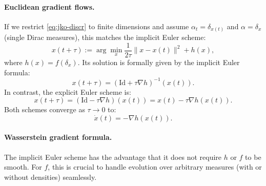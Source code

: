 \paragraph{Euclidean gradient flows.}

If we restrict \eqref{eq:jko-discr} to finite dimensions and assume $\alpha_t = \delta_{x(t)}$ and $\alpha = \delta_x$ (single Dirac measures), this matches the implicit Euler scheme:
\begin{equation}
    x(t+\tau) := \arg\min_x \frac{1}{2 \tau} \|x - x(t)\|^2 + h(x),
\end{equation}
where $h(x) = f(\delta_x)$. Its solution is formally given by the implicit Euler formula:
\begin{equation}
    x(t+\tau) = (\mathrm{Id} + \tau \nabla h)^{-1}(x(t)).
\end{equation}
In contrast, the explicit Euler scheme is:
\begin{equation}
    x(t+\tau) = (\mathrm{Id} - \tau \nabla h)(x(t)) = x(t) - \tau \nabla h(x(t)).
\end{equation}
Both schemes converge as $\tau \to 0$ to:
\begin{equation}
    \dot{x}(t) = -\nabla h(x(t)). \label{eq:grad-flow-classical}
\end{equation}


\paragraph{Wasserstein gradient formula.}

The implicit Euler scheme has the advantage that it does not require $h$ or $f$ to be smooth. For $f$, this is crucial to handle evolution over arbitrary measures (with or without densities) seamlessly.

